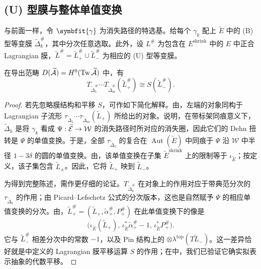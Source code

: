 \subsection{(U) 型膜与整体单值变换}\label{sec:18g}
与前面一样，令 $\symbfit{\gamma}$ 为消失路径的特选基。给每个 $\gamma_k$ 配上 $\widetilde E$ 中的 (B) 型等变膜 $\widetilde\Delta_k^\#$，其中分次任意选取。此外，设 $L^\#$ 为包含在 $E^{\mathrm{shrink}}$ 中的 $E$ 中正合 Lagrangian 膜，$\widetilde L^\#=\widetilde L_+^\#\cup\widetilde L_-^\#$ 为相应的 (U) 型等变膜。

\begin{lemma}\label{st:18.15}
在导出范畴 $D(\widetilde{\mathcal A})=H^0(\operatorname{Tw}\widetilde{\mathcal A})$ 中，有
\begin{equation}\label{eq:18.25}
T_{\widetilde\Delta_1^\#}\cdots T_{\widetilde\Delta_m^\#}(\widetilde L_+^\#)\cong S(\widetilde L_-^\#).
\end{equation}
\end{lemma}
\begin{proof}
若先忽略膜结构和平移 $S$，可作如下简化解释。由，左端的对象同构于 Lagrangian 子流形 $\tau_{\widetilde\Delta_1}\cdots\tau_{\widetilde\Delta_m}(\widetilde L_+)$ 所给出的对象。说明，在带标架同痕意义下，$\widetilde\Delta_k$ 是将 $\gamma_k$ 看成 $\Psi:\widetilde{\mathcal E}\to\mathcal W$ 的消失路径时所对应的消失圈，因此它们的 Dehn 扭转是 $\Psi$ 的单值变换。于是，全部 $\tau_{\widetilde\Delta_k}$ 的复合在 $\operatorname{Aut}(\widetilde E)$ 中同痕于 $\Psi$ 沿 $\mathcal W$ 中半径 $1-3\delta$ 的圆的单值变换。由，该单值变换在子集 $\widetilde E^{\mathrm{shrink}}$ 上的限制等于 $\iota_{\widetilde E}$；按定义，该子集包含 $\widetilde L_\pm$。因此，它将 $\widetilde L_+$ 映到 $\widetilde L_-$。

为得到完整陈述，需作更仔细的论证。$T_{\widetilde\Delta_k^\#}$ 在对象上的作用对应于带典范分次的 $\tau_{\widetilde\Delta_k}$ 的作用；由 Picard--Lefschetz 公式的分次版本，这也是自然赋予 $\Psi$ 的相应单值变换的分次。由，$\widetilde L_+^\#=(\widetilde L_+,\widetilde\alpha_+^\#,P_+^\#)$ 在此单值变换下的像是
\[
\bigl(\iota_{\widetilde E}(\widetilde L_+),\,
\iota_{\widetilde E}^*\widetilde\alpha_+^\#-1,\,
\iota_{\widetilde E}^*P_+^\#\bigr).
\]
它与 $\widetilde L_-^\#$ 相差分次中的常数 $-1$，以及 Pin 结构上的 $\otimes\lambda^{\mathrm{top}}(T\widetilde L_-)$。这一差异恰好就是中定义的 Lagrangian 膜平移运算 $S$ 的作用；在中，我们已验证它确实拟表示抽象的代数平移。
\end{proof}

